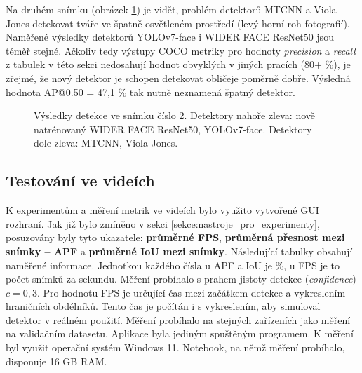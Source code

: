 Na druhém snímku (obrázek \ref{obrazek:test2}) je vidět, problém detektorů MTCNN a Viola-Jones detekovat tváře ve špatně osvětleném prostředí (levý horní roh fotografií). Naměřené výsledky detektorů YOLOv7-face i WIDER FACE ResNet50 jsou téměř stejné. Ačkoliv tedy výstupy COCO metriky pro  hodnoty \emph{precision} a \emph{recall} z tabulek v této sekci nedosahují hodnot obvyklých v jiných pracích (80+ \%), je zřejmé, že nový detektor je schopen detekovat obličeje poměrně dobře. Výsledná hodnota AP@0.50 = 47,1 \% tak nutně neznamená špatný detektor.

\begin{figure}[H] 
  \begin{center}
  \label{obrazek:test2}
  \caption{Výsledky detekce ve snímku číslo 2. Detektory nahoře zleva: nově natrénovaný WIDER FACE ResNet50, YOLOv7-face. Detektory dole zleva: MTCNN, Viola-Jones.}
  \end{center}
\end{figure}

\subsection*{Testování ve videích}
K experimentům a měření metrik ve videích bylo využito vytvořené GUI rozhraní. Jak již bylo zmíněno v sekci \ref{sekce:nastroje_pro_experimenty}, posuzovány byly tyto ukazatele: \textbf{průměrné FPS}, \textbf{průměrná přesnost mezi snímky -- APF} a \textbf{průměrné IoU mezi snímky}. Následující tabulky obsahují naměřené informace. Jednotkou každého čísla u APF a IoU je \%, u FPS je to počet snímků za sekundu. Měření probíhalo s prahem jistoty detekce (\emph{confidence}) $c = 0,3$. Pro hodnotu FPS je určující čas mezi začátkem detekce a vykreslením hraničních obdélníků. Tento čas je počítán i s vykreslením, aby simuloval detektor v reálném použití. Měření probíhalo na stejných zařízeních jako měření na validačním datasetu. Aplikace byla jediným spuštěným programem. K měření byl využit operační systém Windows 11. Notebook, na němž měření probíhalo, disponuje 16 GB RAM.


